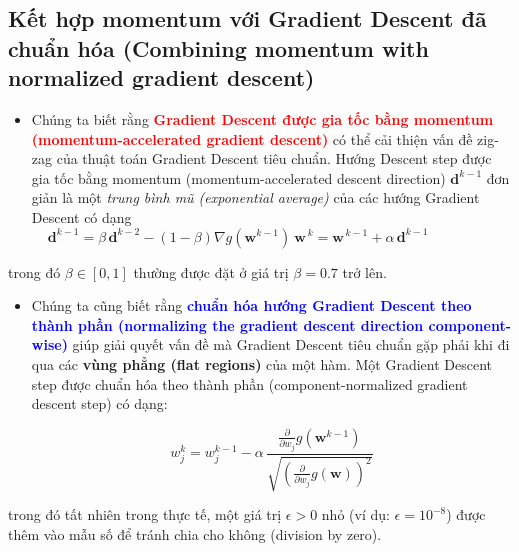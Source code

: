 \documentclass{book}
\begin{document}
\subsection{Kết hợp momentum với Gradient Descent đã chuẩn hóa (Combining momentum with normalized gradient descent)}
\begin{itemize}
    \item Chúng ta biết rằng \textbf{\textcolor{red}{Gradient Descent được gia tốc bằng momentum (momentum-accelerated gradient descent)}} có thể cải thiện vấn đề zig-zag của thuật toán Gradient Descent tiêu chuẩn. Hướng Descent step được gia tốc bằng momentum (momentum-accelerated descent direction) $\mathbf{d}^{k-1}$ đơn giản là một \textit{trung bình mũ (exponential average)} của các hướng Gradient Descent có dạng
    \begin{equation}
        \mathbf{d}^{k-1} = \beta \, \mathbf{d}^{k-2}  - \left(1 - \beta\right)\nabla g\left(\mathbf{w}^{k-1}\right) \
        \mathbf{w}^{\,k} = \mathbf{w}^{\,k-1} + \alpha \, \mathbf{d}^{k-1} \,\,\,\,\,\,\,\,\,\,\,\,\,     \,\,\,\,\,\,\,\,\,\,\,\,\,      \,\,\,
    \end{equation}
\end{itemize}
trong đó $\beta \in \left[0,1 \right]$ thường được đặt ở giá trị $\beta = 0.7$ trở lên.
\begin{itemize}
    \item Chúng ta cũng biết rằng \textbf{\textcolor{blue}{chuẩn hóa hướng Gradient Descent theo thành phần (normalizing the gradient descent direction component-wise)}} giúp giải quyết vấn đề mà Gradient Descent tiêu chuẩn gặp phải khi đi qua các \textbf{vùng phẳng (flat regions)} của một hàm. Một Gradient Descent step được chuẩn hóa theo thành phần (component-normalized gradient descent step) có dạng:

    \begin{equation*}
        w_j^k = w_j^{k-1} - \alpha \, \frac{\frac{\partial}{\partial w_j}g\left(\mathbf{w}^{k-1}\right)}{{\sqrt{\left(\frac{\partial}{\partial w_j}g\left(\mathbf{w}\right)\right)^2}}}
    \end{equation*}

\end{itemize}
trong đó tất nhiên trong thực tế, một giá trị $\epsilon > 0$ nhỏ (ví dụ: $\epsilon = 10^{-8}$) được thêm vào mẫu số để tránh chia cho không (division by zero).
\end{document}
